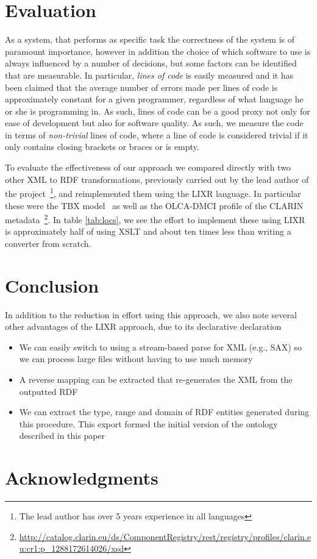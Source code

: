 \documentclass{acm_proc_article-sp}
\begin{document}
\section{Evaluation}
\label{sec:results}


As a system, that performs as specific task the correctness of the system is of 
paramount importance, however in addition the choice of which software to use
is always influenced by a number of decisions, but some factors can be identified
that are measurable. In particular, \emph{lines of code} is easily measured and it
has been claimed that the average number of errors made per lines of code is 
approximately constant for a given programmer, regardless of what language he or
she is programming in. As such, lines of code can be a good proxy not only for
ease of development but also for software quality. As such, we measure the
code in terms of \emph{non-trivial} lines of code, where a line of code
is considered trivial if it only contains closing brackets or braces or is empty.

To evaluate the effectiveness of our approach we compared directly with two other
XML to RDF transformations, previously carried out by the lead author of the
project~\footnote{The lead author has over 5 years experience in all languages}, and
reimplemented them using the LIXR language. In particular these were the TBX
model~\cite{iso30042} as well as the OLCA-DMCI profile of the CLARIN
metadata~\footnote{\url{http://catalog.clarin.eu/ds/ComponentRegistry/rest/registry/profiles/clarin.eu:cr1:p\_1288172614026/xsd}}. In table \ref{tab:locs}, we see the
effort to implement these using LIXR is approximately half of using XSLT and
about ten times less than writing a converter from scratch.


\section{Conclusion}
\label{sec:conclusion}

In addition to the reduction in effort using this approach, we also note several
other advantages of the LIXR approach, due to its declarative declaration
\begin{itemize}
\item We can easily switch to using a stream-based parse for XML (e.g., SAX)
so we can process large files without having to use much memory
\item A reverse mapping can be extracted that re-generates the XML from the
outputted RDF
\item We can extract the type, range and domain of RDF entities generated
during this procedure. This export formed the initial version of the
ontology described in this paper
\end{itemize}


\section*{Acknowledgments}



\end{document}
